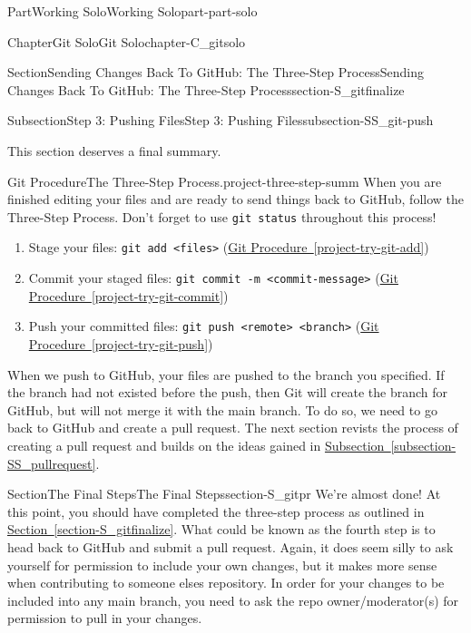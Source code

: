 \documentclass[oneside,10pt,]{book}
\newcommand{\xreffont}{\relax}
\newcommand{\mono}[1]{\texttt{#1}}
\begin{document}
\begin{partptx}{Part}{Working Solo}{}{Working Solo}{}{}{part-part-solo}
\begin{chapterptx}{Chapter}{Git Solo}{}{Git Solo}{}{}{chapter-C_gitsolo}
\begin{sectionptx}{Section}{Sending Changes Back To GitHub: The Three-Step Process}{}{Sending Changes Back To GitHub: The Three-Step Process}{}{}{section-S_gitfinalize}
\begin{subsectionptx}{Subsection}{Step 3: Pushing Files}{}{Step 3: Pushing Files}{}{}{subsection-SS_git-push}
\par
This section deserves a final summary.%
\begin{project}{Git Procedure}{The Three-Step Process.}{project-three-step-summ}%
%
%
When you are finished editing your files and are ready to send things back to GitHub, follow the Three-Step Process. Don't forget to use \mono{git status} throughout this process!%
\begin{enumerate}
\item{}Stage your files: \mono{git add <files>} (\hyperref[project-try-git-add]{Git Procedure~{\xreffont\ref{project-try-git-add}}})%
\item{}Commit your staged files: \mono{git commit -m \textquotedbl{}<commit-message>\textquotedbl{}} (\hyperref[project-try-git-commit]{Git Procedure~{\xreffont\ref{project-try-git-commit}}})%
\item{}Push your committed files: \mono{git push <remote> <branch>} (\hyperref[project-try-git-push]{Git Procedure~{\xreffont\ref{project-try-git-push}}})%
\end{enumerate}
%
\end{project}%
\end{subsectionptx}
\begin{conclusion}{}%
When we push to GitHub, your files are pushed to the branch you specified. If the branch had not existed before the push, then Git will create the branch for GitHub, but will not merge it with the main branch. To do so, we need to go back to GitHub and create a pull request. The next section revists the process of creating a pull request and builds on the ideas gained in \hyperref[subsection-SS_pullrequest]{Subsection~{\xreffont\ref{subsection-SS_pullrequest}}}.%
\end{conclusion}%
\end{sectionptx}
%
%
\typeout{************************************************}
\typeout{************************************************}
%
\begin{sectionptx}{Section}{The Final Steps}{}{The Final Steps}{}{}{section-S_gitpr}
%
%
%
We're almost done! At this point, you should have completed the three-step process as outlined in \hyperref[section-S_gitfinalize]{Section~{\xreffont\ref{section-S_gitfinalize}}}. What could be known as the fourth step is to head back to GitHub and submit a pull request. Again, it does seem silly to ask yourself for permission to include your own changes, but it makes more sense when contributing to someone elses repository. In order for your changes to be included into any main branch, you need to ask the repo owner\slash{}moderator(s) for permission to pull in your changes.%

\end{sectionptx}
\end{chapterptx}
\end{partptx}
\end{document}
